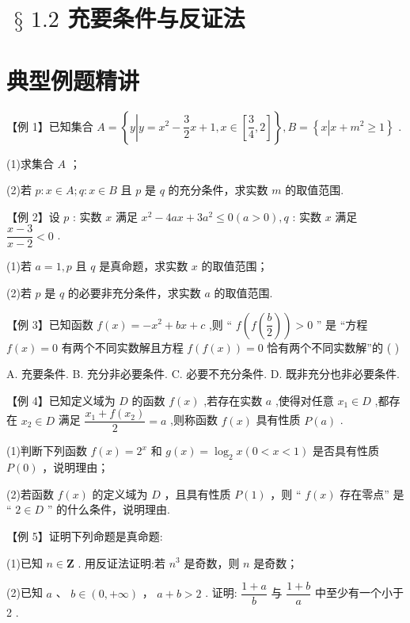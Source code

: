 \section*{$\text{ § }{1.2}$ 充要条件与反证法}

\section*{典型例题精讲}

【例 1】已知集合 $A = \left\{  {y\left| {y = {x}^{2} - \dfrac{3}{2}x + 1}\right. ,x \in  \left\lbrack  {\dfrac{3}{4},2}\right\rbrack  }\right\}  ,B = \left\{  {x\left| {x + {m}^{2} \geq  1}\right. }\right\}$ .

(1)求集合 $A$ ；

(2)若 $p : x \in  A;q : x \in  B$ 且 $p$ 是 $q$ 的充分条件，求实数 $m$ 的取值范围.

【例 2】设 $p$ : 实数 $x$ 满足 ${x}^{2} - {4ax} + 3{a}^{2} \leq  0\left( {a > 0}\right) ,q$ : 实数 $x$ 满足 $\dfrac{x - 3}{x - 2} < 0$ .

(1)若 $a = 1,p$ 且 $q$ 是真命题，求实数 $x$ 的取值范围；

(2)若 $p$ 是 $q$ 的必要非充分条件，求实数 $a$ 的取值范围.

【例 3】已知函数 $f\left( x\right)  =  - {x}^{2} + {bx} + c$ ,则 “ $f\left( {f\left( \dfrac{b}{2}\right) }\right)  > 0$ ” 是 “方程 $f\left( x\right)  = 0$ 有两个不同实数解且方程 $f\left( {f\left( x\right) }\right)  = 0$ 恰有两个不同实数解”的 ( )

A. 充要条件. B. 充分非必要条件. C. 必要不充分条件. D. 既非充分也非必要条件.

【例 4】已知定义域为 $D$ 的函数 $f\left( x\right)$ ,若存在实数 $a$ ,使得对任意 ${x}_{1} \in  D$ ,都存在 ${x}_{2} \in  D$ 满足 $\dfrac{{x}_{1} + f\left( {x}_{2}\right) }{2} = a$ ,则称函数 $f\left( x\right)$ 具有性质 $P\left( a\right)$ .

(1)判断下列函数 $f\left( x\right)  = {2}^{x}$ 和 $g\left( x\right)  = {\log }_{2}x\left( {0 < x < 1}\right)$ 是否具有性质 $P\left( 0\right)$ ，说明理由；

(2)若函数 $f\left( x\right)$ 的定义域为 $D$ ，且具有性质 $P\left( 1\right)$ ，则 “ $f\left( x\right)$ 存在零点” 是 “ $2 \in  D$ ” 的什么条件，说明理由.

【例 5】证明下列命题是真命题:

(1)已知 $n \in  \mathbf{Z}$ . 用反证法证明:若 ${n}^{3}$ 是奇数，则 $n$ 是奇数；

(2)已知 $a$ 、 $b \in  \left( {0, + \infty }\right)$ ， $a + b > 2$ . 证明: $\dfrac{1 + a}{b}$ 与 $\dfrac{1 + b}{a}$ 中至少有一个小于 2 .


